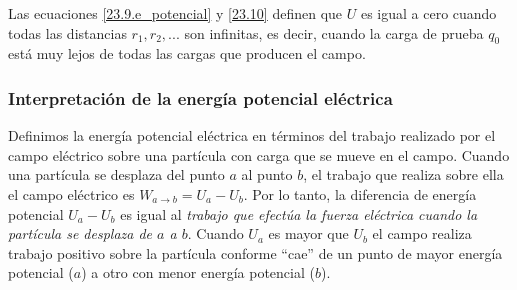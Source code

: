 Las ecuaciones \ref{23.9.e_potencial} y \ref{23.10} definen que $U$ es igual a cero cuando todas las distancias $r_1, r_2, . . .$ son infinitas, es decir, cuando la carga de prueba $q_0$ está muy lejos de todas las cargas que producen el campo.

\subsubsection{Interpretación de la energía potencial eléctrica}
Definimos la energía potencial eléctrica en términos del trabajo realizado por el campo eléctrico sobre una partícula con carga que se mueve en el campo. Cuando una partícula se desplaza del punto $a$ al punto $b$, el trabajo que realiza sobre ella el campo eléctrico es $W_{a\to b}=U_a-U_b$. Por lo tanto, la diferencia de energía potencial $U_a-U_b$ es igual al \textit{trabajo que efectúa la fuerza eléctrica cuando la partícula se desplaza de $a$ a $b$}. Cuando $U_a$ es mayor que $U_b$ el campo realiza trabajo positivo sobre la partícula conforme “cae” de un punto de mayor energía potencial ($a$) a otro con menor energía potencial ($b$).




